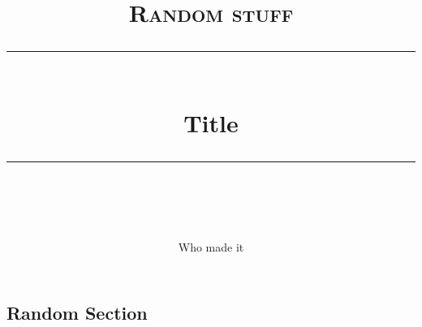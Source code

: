 \documentclass[11pt, a4paper]{article} %
\title{	
	\normalfont\normalsize
	\textsc{Random stuff}\\ %
	\vspace{5pt} %
	\rule{\linewidth}{0.2pt}\\ %
	\vspace{10pt} %
	{\huge Title}\\ %
	\vspace{5pt} %
	\rule{\linewidth}{-2pt}\\ %
	\vspace{-25pt} %
	\date{}
}
\author{Who made it}
\begin{document}
\maketitle 




\subsection*{Random Section}

\cite{Danielsson:2018ztv}







\end{document}
